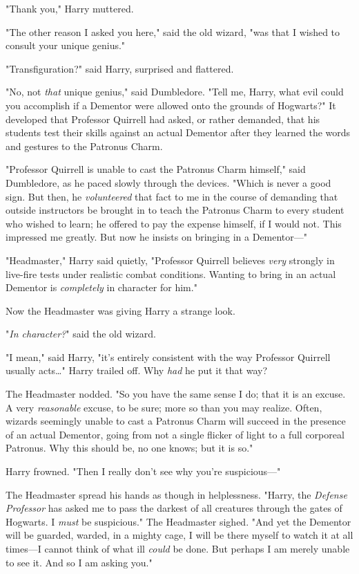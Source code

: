 "Thank you," Harry muttered.

"The other reason I asked you here," said the old wizard, "was that I wished to
consult your unique genius."

"Transfiguration?" said Harry, surprised and flattered.

"No, not \emph{that} unique genius," said Dumbledore. "Tell me, Harry, what
evil could you accomplish if a Dementor were allowed onto the grounds of
Hogwarts?"
\later
It developed that Professor Quirrell had asked, or rather demanded, that his
students test their skills against an actual Dementor after they learned the
words and gestures to the Patronus Charm.

"Professor Quirrell is unable to cast the Patronus Charm himself," said
Dumbledore, as he paced slowly through the devices. "Which is never a good
sign. But then, he \emph{volunteered} that fact to me in the course of
demanding that outside instructors be brought in to teach the Patronus Charm to
every student who wished to learn; he offered to pay the expense himself, if I
would not. This impressed me greatly. But now he insists on bringing in a
Dementor---"

"Headmaster," Harry said quietly, "Professor Quirrell believes \emph{very}
strongly in live-fire tests under realistic combat conditions. Wanting to bring
in an actual Dementor is \emph{completely} in character for him."

Now the Headmaster was giving Harry a strange look.

"\emph{In character?}" said the old wizard.

"I mean," said Harry, "it's entirely consistent with the way Professor Quirrell
usually acts{\ldots}" Harry trailed off. Why \emph{had} he put it that way?

The Headmaster nodded. "So you have the same sense I do; that it is an excuse.
A very \emph{reasonable} excuse, to be sure; more so than you may realize.
Often, wizards seemingly unable to cast a Patronus Charm will succeed in the
presence of an actual Dementor, going from not a single flicker of light to a
full corporeal Patronus. Why this should be, no one knows; but it is so."

Harry frowned. "Then I really don't see why you're suspicious---"

The Headmaster spread his hands as though in helplessness. "Harry, the
\emph{Defense Professor} has asked me to pass the darkest of all creatures
through the gates of Hogwarts. I \emph{must} be suspicious." The Headmaster
sighed. "And yet the Dementor will be guarded, warded, in a mighty cage, I will
be there myself to watch it at all times---I cannot think of what ill
\emph{could} be done. But perhaps I am merely unable to see it. And so I am
asking you."

